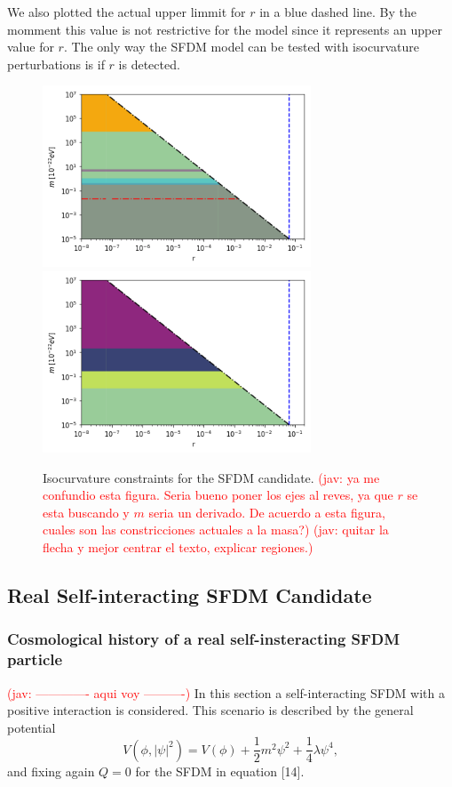 \documentclass[amssymb,twocolumn,prd,nofootinbib,showpacs]{revtex4-1}
\newcommand{\jav}[1]{\textcolor{red}{(jav: #1)}}
\begin{document}
We also plotted the actual upper limmit for $r$ in a blue dashed line. By the momment this value is not restrictive for the model since it represents an upper value for $r$. The only way the SFDM model can be tested with
isocurvature perturbations is if $r$ is detected.
\begin{figure}[h!]
\includegraphics[width=8cm]{SFDMconstraints.png}
\includegraphics[width=8cm]{SFDMconstraints2.png}
\caption{Isocurvature constraints for the SFDM candidate.
\jav{ya me confundio esta figura. Seria bueno poner los ejes al reves, ya que $r$ se esta buscando 
y $m$ seria un derivado. De acuerdo a esta figura, cuales son las constricciones actuales a la masa?}
\jav{quitar la flecha y mejor centrar el texto, explicar regiones.}
}\label{constraintsSFDM}
\end{figure}
\subsection{Real Self-interacting SFDM Candidate}
\subsubsection{Cosmological history of a real self-insteracting SFDM particle}
\jav{ ------------- aqui voy ----------}
In this section a self-interacting SFDM with a positive interaction is considered. This scenario is described by the general potential
\begin{equation}
V(\phi,|\psi|^2)=V(\phi)+\frac{1}{2}m^2\psi^2+\frac{1}{4}\lambda\psi^4,
\end{equation}
and fixing again $Q=0$ for the SFDM in equation [14].
\end{document}
